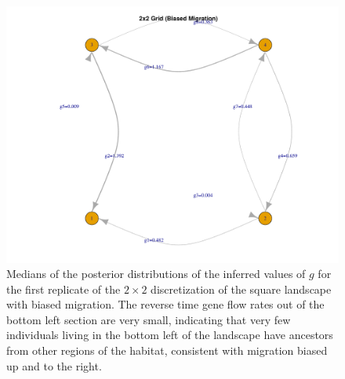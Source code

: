 \documentclass{article}
\begin{document}
\begin{figure}
\centering
 \includegraphics[scale=.5]{figs/2x2grid_asb}
\caption{Medians of the posterior distributions of the inferred values of $g$ 
for the first replicate of the $2 \times 2$ discretization of the square landscape with biased migration.
The reverse time gene flow rates out of the bottom left section are very small,
indicating that very few individuals living in the bottom left of the landscape
have ancestors from other regions of the habitat,
consistent with migration biased up and to the right.}
\label{fig:2x2grid_asb}
\end{figure}
\end{document}
